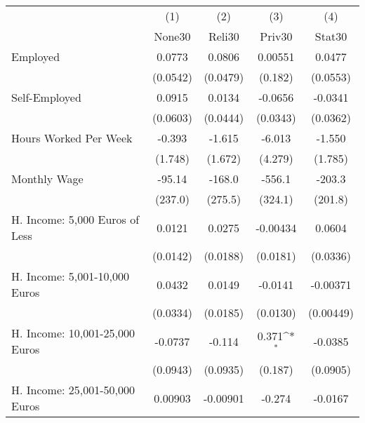 {
\def\sym#1{\ifmmode^{#1}\else\(^{#1}\)\fi}
\begin{tabular}{l*{4}{c}}
\hline\hline
            &\multicolumn{1}{c}{(1)}&\multicolumn{1}{c}{(2)}&\multicolumn{1}{c}{(3)}&\multicolumn{1}{c}{(4)}\\
            &\multicolumn{1}{c}{None30}&\multicolumn{1}{c}{Reli30}&\multicolumn{1}{c}{Priv30}&\multicolumn{1}{c}{Stat30}\\
\hline
Employed    &      0.0773         &      0.0806         &     0.00551         &      0.0477         \\
            &    (0.0542)         &    (0.0479)         &     (0.182)         &    (0.0553)         \\
[1em]
Self-Employed&      0.0915         &      0.0134         &     -0.0656         &     -0.0341         \\
            &    (0.0603)         &    (0.0444)         &    (0.0343)         &    (0.0362)         \\
[1em]
Hours Worked Per Week&      -0.393         &      -1.615         &      -6.013         &      -1.550         \\
            &     (1.748)         &     (1.672)         &     (4.279)         &     (1.785)         \\
[1em]
Monthly Wage&      -95.14         &      -168.0         &      -556.1         &      -203.3         \\
            &     (237.0)         &     (275.5)         &     (324.1)         &     (201.8)         \\
[1em]
H. Income: 5,000 Euros of Less&      0.0121         &      0.0275         &    -0.00434         &      0.0604         \\
            &    (0.0142)         &    (0.0188)         &    (0.0181)         &    (0.0336)         \\
[1em]
H. Income: 5,001-10,000 Euros&      0.0432         &      0.0149         &     -0.0141         &    -0.00371         \\
            &    (0.0334)         &    (0.0185)         &    (0.0130)         &   (0.00449)         \\
[1em]
H. Income: 10,001-25,000 Euros&     -0.0737         &      -0.114         &       0.371\sym{*}  &     -0.0385         \\
            &    (0.0943)         &    (0.0935)         &     (0.187)         &    (0.0905)         \\
[1em]
H. Income: 25,001-50,000 Euros&     0.00903         &    -0.00901         &      -0.274         &     -0.0167         \\

\end{tabular}}
